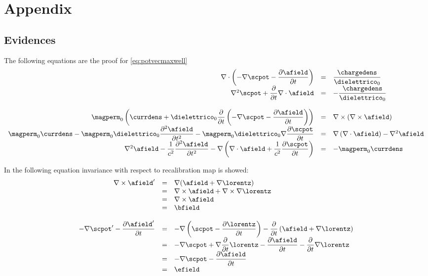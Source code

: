 
\section{Appendix}

\subsection{Evidences}

The following equations are the proof for \ref{eq:potvecmaxwell}
\begin{equation}
\begin{array}{rcl}
\nabla \cdot \left(  - \nabla \scpot - \partialtarg{\afield} \right) & = & \dfrac{\chargedens}{\dielettrico_0} \\
\nabla^2 \scpot + \partialt{\nabla \cdot \afield} & = & -\dfrac{\chargedens}{\dielettrico_0} \\
 & & \\
\magperm_0 \left( \currdens + \dielettrico_0 \partialt\left(- \nabla \scpot - \partialtarg{\afield}\right) \right) & = & \nabla \times \left( \nabla \times \afield \right) \\
\magperm_0 \currdens - \magperm_0 \dielettrico_0 \dfrac{\partial^2 \afield}{\partial t^2} - \magperm_0 \dielettrico_0 \nabla \dfrac{\partial \scpot}{\partial t} & = & \nabla \left( \nabla \cdot \afield \right) - \nabla^2 \afield \\
\nabla^2 \afield - \dfrac{1}{c^2} \dfrac{\partial^2 \afield}{\partial t^2} - \nabla \left( \nabla \cdot \afield + \dfrac{1}{c^2} \dfrac{\partial \scpot}{\partial t} \right) & = & - \magperm_0 \currdens
\end{array}
\label{eq:evidence1}
\end{equation}

In the following equation invariance with respect to recalibration map is showed:
\begin{equation}
\label{eq:prooftransformationmap}
\begin{array}{rcl}
\nabla \times \afield' & = & \nabla(\afield + \nabla \lorentz) \\
 & = & \nabla \times \afield + \nabla \times \nabla \lorentz \\
 & = & \nabla \times \afield \\
 & = & \bfield \\
 & & \\
- \nabla\scpot' - \partialtarg{\afield'} & = & -\nabla \left( \scpot - \partialtarg{\lorentz} \right) - \partialt\left( \afield + \nabla \lorentz \right) \\
 & = & -\nabla \scpot + \nabla \partialt \lorentz - \partialtarg{\afield} - \partialt\nabla\lorentz \\
 & = & -\nabla \scpot - \partialtarg{\afield} \\
 & = & \efield
\end{array}
\end{equation}

